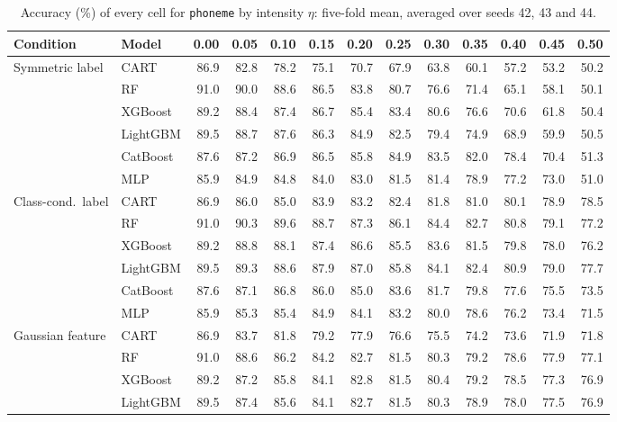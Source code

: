 \documentclass[pdflatex,sn-mathphys]{sn-jnl}
\theoremstyle{thmstyleone}
\begin{document}
\begin{table}[htbp]
\centering
\tiny
\setlength{\tabcolsep}{2.6pt}
\caption{Accuracy (\%) of every cell for \texttt{phoneme} by intensity $\eta$: five-fold mean, averaged over seeds 42, 43 and 44.}
\label{tab:grid_phoneme}
\begin{tabular}{@{}llrrrrrrrrrrr@{}}
\toprule
Condition & Model & 0.00 & 0.05 & 0.10 & 0.15 & 0.20 & 0.25 & 0.30 & 0.35 & 0.40 & 0.45 & 0.50 \\
\midrule
Symmetric label & CART & 86.9 & 82.8 & 78.2 & 75.1 & 70.7 & 67.9 & 63.8 & 60.1 & 57.2 & 53.2 & 50.2 \\
 & RF & 91.0 & 90.0 & 88.6 & 86.5 & 83.8 & 80.7 & 76.6 & 71.4 & 65.1 & 58.1 & 50.1 \\
 & XGBoost & 89.2 & 88.4 & 87.4 & 86.7 & 85.4 & 83.4 & 80.6 & 76.6 & 70.6 & 61.8 & 50.4 \\
 & LightGBM & 89.5 & 88.7 & 87.6 & 86.3 & 84.9 & 82.5 & 79.4 & 74.9 & 68.9 & 59.9 & 50.5 \\
 & CatBoost & 87.6 & 87.2 & 86.9 & 86.5 & 85.8 & 84.9 & 83.5 & 82.0 & 78.4 & 70.4 & 51.3 \\
 & MLP & 85.9 & 84.9 & 84.8 & 84.0 & 83.0 & 81.5 & 81.4 & 78.9 & 77.2 & 73.0 & 51.0 \\
\midrule
Class-cond.\ label & CART & 86.9 & 86.0 & 85.0 & 83.9 & 83.2 & 82.4 & 81.8 & 81.0 & 80.1 & 78.9 & 78.5 \\
 & RF & 91.0 & 90.3 & 89.6 & 88.7 & 87.3 & 86.1 & 84.4 & 82.7 & 80.8 & 79.1 & 77.2 \\
 & XGBoost & 89.2 & 88.8 & 88.1 & 87.4 & 86.6 & 85.5 & 83.6 & 81.5 & 79.8 & 78.0 & 76.2 \\
 & LightGBM & 89.5 & 89.3 & 88.6 & 87.9 & 87.0 & 85.8 & 84.1 & 82.4 & 80.9 & 79.0 & 77.7 \\
 & CatBoost & 87.6 & 87.1 & 86.8 & 86.0 & 85.0 & 83.6 & 81.7 & 79.8 & 77.6 & 75.5 & 73.5 \\
 & MLP & 85.9 & 85.3 & 85.4 & 84.9 & 84.1 & 83.2 & 80.0 & 78.6 & 76.2 & 73.4 & 71.5 \\
\midrule
Gaussian feature & CART & 86.9 & 83.7 & 81.8 & 79.2 & 77.9 & 76.6 & 75.5 & 74.2 & 73.6 & 71.9 & 71.8 \\
 & RF & 91.0 & 88.6 & 86.2 & 84.2 & 82.7 & 81.5 & 80.3 & 79.2 & 78.6 & 77.9 & 77.1 \\
 & XGBoost & 89.2 & 87.2 & 85.8 & 84.1 & 82.8 & 81.5 & 80.4 & 79.2 & 78.5 & 77.3 & 76.9 \\
 & LightGBM & 89.5 & 87.4 & 85.6 & 84.1 & 82.7 & 81.5 & 80.3 & 78.9 & 78.0 & 77.5 & 76.9 \\

\end{tabular}
\end{table}
\end{document}
